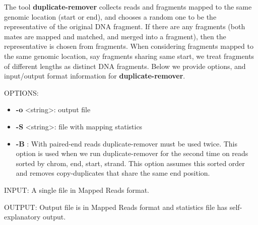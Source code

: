 \documentclass{article}
\begin{document}
The tool \textbf{duplicate-remover} collects reads and fragments mapped to the same
genomic location (start or end), and chooses a random one to be the representative of 
the original DNA fragment. If there are any fragments (both mates are mapped and matched, and 
merged into a fragment), then the representative is chosen from fragments. When considering
fragments mapped to the same genomic location, say fragments sharing same start, 
we treat fragments of different lengths as distinct DNA fragments. Below we provide options, 
and input/output format information for \textbf{duplicate-remover}.

OPTIONS:
\begin{itemize}
\item
\textbf{-o} \textless string\textgreater : output file
\item
\textbf{-S} \textless string\textgreater : file with mapping statistics
\item
\textbf{-B} : With paired-end reads duplicate-remover must be used twice. This option is used
	when we run duplicate-remover for the second time on reads sorted by chrom, end, start, strand.
	This option assumes this sorted order and removes copy-duplicates that share the same
	end position.
\end{itemize}

INPUT: A single file in Mapped Reads format.

OUTPUT: Output file is in Mapped Reads format and statistics file has self-explanatory output.
\end{document}
